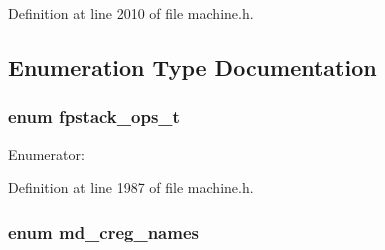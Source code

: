 Definition at line 2010 of file machine.h.

\subsection{Enumeration Type Documentation}
\subsubsection[{fpstack\_\-ops\_\-t}]{\setlength{\rightskip}{0pt plus 5cm}enum {\bf fpstack\_\-ops\_\-t}}\label{machine_8h_bbcc806996635e0671f66e73317b0c96}


\begin{Desc}
\item[Enumerator: ]\par
\begin{description}
\item[{\em 
fpstk\_\-nop\label{machine_8h_bbcc806996635e0671f66e73317b0c9646e33ab1efe19f95f336d480778b1669}
}]\item[{\em 
fpstk\_\-pop\label{machine_8h_bbcc806996635e0671f66e73317b0c96f60fce53628a86f2aafb45582f8f3d1b}
}]\item[{\em 
fpstk\_\-poppop\label{machine_8h_bbcc806996635e0671f66e73317b0c962c9fa36b0dcfd045a4899d727ea9644d}
}]\item[{\em 
fpstk\_\-push\label{machine_8h_bbcc806996635e0671f66e73317b0c96ca98630b2266108adf34af9035ec929d}
}]\end{description}
\end{Desc}



Definition at line 1987 of file machine.h.
\subsubsection[{md\_\-creg\_\-names}]{\setlength{\rightskip}{0pt plus 5cm}enum {\bf md\_\-creg\_\-names}}\label{machine_8h_f078ffebd93269a86355d7e41c6fd6f1}


